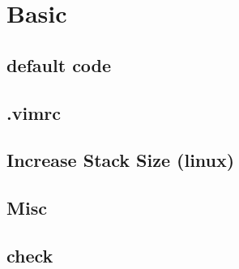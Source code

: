 \documentclass[a4paper,10pt,twocolumn,oneside]{article}
\begin{document}
\pagestyle{fancy}
\fancyhead[R]{\thepage}
\renewcommand{\headrulewidth}{0.4pt}
\renewcommand{\contentsname}{Contents} 

\scriptsize
\tableofcontents


\section{Basic}

\subsection{default code}


\subsection{.vimrc}


\subsection{Increase Stack Size (linux)}


% 

\subsection{Misc}


\subsection{check}


% 

% 
\end{document}
